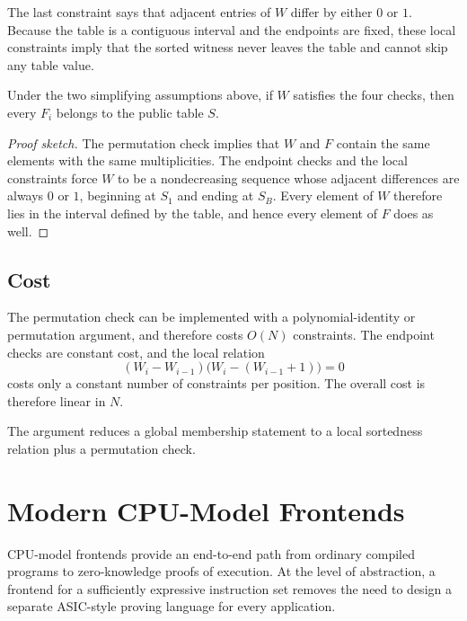 \documentclass[11pt]{article}
\begin{document}
The last constraint says that adjacent entries of $W$ differ by either $0$ or
$1$.  Because the table is a contiguous interval and the endpoints are fixed,
these local constraints imply that the sorted witness never leaves the table
and cannot skip any table value.

\begin{proposition}
Under the two simplifying assumptions above, if $W$ satisfies the four checks,
then every $F_i$ belongs to the public table $S$.
\end{proposition}

\begin{proof}[Proof sketch]
The permutation check implies that $W$ and $F$ contain the same elements with
the same multiplicities.  The endpoint checks and the local constraints force
$W$ to be a nondecreasing sequence whose adjacent differences are always $0$ or
$1$, beginning at $S_1$ and ending at $S_B$.  Every element of $W$ therefore
lies in the interval defined by the table, and hence every element of $F$ does
as well.
\end{proof}

\subsection{Cost}

The permutation check can be implemented with a polynomial-identity or
permutation argument, and therefore costs $O(N)$ constraints.  The endpoint
checks are constant cost, and the local relation
\[
  (W_i - W_{i-1})\bigl(W_i - (W_{i-1}+1)\bigr) = 0
\]
costs only a constant number of constraints per position.  The overall cost is
therefore linear in $N$.

\begin{remark}
The argument reduces a global membership statement to a local sortedness
relation plus a permutation check.
\end{remark}

\section{Modern CPU-Model Frontends}

CPU-model frontends provide an end-to-end path from ordinary compiled programs
to zero-knowledge proofs of execution.  At the level of abstraction, a frontend
for a sufficiently expressive instruction set removes the need to design a
separate ASIC-style proving language for every application.
\end{document}

